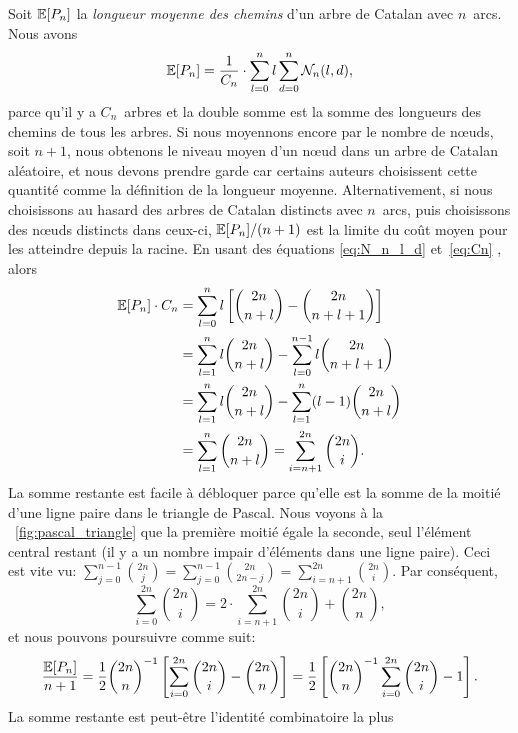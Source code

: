 Soit \(\mathbb{E}[{P_n}]\) la \emph{longueur moyenne des chemins} d'un
arbre de Catalan avec \(n\)~arcs. Nous avons
\begin{equation*}
  \mathbb{E}[{P_n}] = \frac{1}{C_{n}} \cdot \sum_{l=0}^{n}l\sum_{d=0}^{n}\mathcal{N}_n(l,d),
\end{equation*}
parce qu'il y a \(C_n\)~arbres et la double somme est la somme des
longueurs des chemins de tous les arbres. Si nous moyennons encore par
le nombre de nœuds, soit \(n+1\), nous obtenons le niveau moyen
d'un nœud dans un arbre de Catalan aléatoire, et nous devons
prendre garde car certains auteurs choisissent cette quantité comme la
définition de la longueur moyenne. Alternativement, si nous
choisissons au hasard des arbres de Catalan distincts avec \(n\)~arcs,
puis choisissons des nœuds distincts dans ceux-ci,
\(\mathbb{E}[{P_n}]/(n+1)\) est la limite du coût moyen pour les
atteindre depuis la racine. En usant des équations \eqref{eq:N_n_l_d}
et~\eqref{eq:Cn} , alors
\begin{align*}
\mathbb{E}[{P_n}] \cdot C_n
 &= \sum_{l=0}^{n}l\left[\binom{2n}{n+l} - \binom{2n}{n+l+1}\right]\\
 &= \sum_{l=1}^{n}l \binom{2n}{n+l} - \sum_{l=0}^{n-1}l \binom{2n}{n+l+1}\\
 &= \sum_{l=1}^{n}l \binom{2n}{n+l} - \sum_{l=1}^{n}(l-1)\binom{2n}{n+l}\\
 &= \sum_{l=1}^{n}\binom{2n}{n+l}
  = \sum_{i=n+1}^{2n}\binom{2n}{i}.
\end{align*}
La somme restante est facile à débloquer parce qu'elle est la somme de
la moitié d'une ligne paire dans le triangle de Pascal. Nous voyons à
la \fig~\vref{fig:pascal_triangle} que la première moitié égale la
seconde, seul l'élément central restant (il y a un nombre impair
d'éléments dans une ligne paire). Ceci est vite vu:
\(\sum_{j=0}^{n-1}\binom{2n}{j} = \sum_{j=0}^{n-1}\binom{2n}{2n-j} =
\sum_{i=n+1}^{2n}\binom{2n}{i}\). Par conséquent,
\begin{equation*}
\sum_{i=0}^{2n}\binom{2n}{i} = 2 \cdot \!\! \sum_{i=n+1}^{2n}\binom{2n}{i}
+ \binom{2n}{n},
\end{equation*}
et nous pouvons poursuivre comme suit:
\begin{equation*}
\frac{\mathbb{E}[{P_n}]}{n+1}
  = \frac{1}{2}\binom{2n}{n}^{-1}\left[\sum_{i=0}^{2n}\binom{2n}{i} -
    \binom{2n}{n}\right]
  = \frac{1}{2}\left[\binom{2n}{n}^{-1}\sum_{i=0}^{2n}\binom{2n}{i} - 1\right].
\end{equation*}
La somme restante est peut-être l'identité combinatoire la plus
